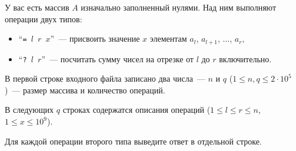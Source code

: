 
\Legend
У вас есть массив $A$ изначально заполненный нулями. Над ним выполняют операции двух типов:

\begin{itemize}
	\item ``\texttt{= $l$ $r$ $x$}''~--- присвоить значение $x$ элементам $a_l$, $a_{l+1}$, ..., $a_r$,
	\item ``\texttt{? $l$ $r$}''~--- посчитать сумму чисел на отрезке от $l$ до $r$ включительно.
\end{itemize}

\Input
В первой строке входного файла записано два числа~--- $n$ и $q$ ($1 \le n, q \le 2 \cdot 10^5$)~---
размер массива и количество операций.

В следующих $q$ строках содержатся описания операций ($1 \le l \le r \le n$, $1 \le x \le 10^9$).

\Output
Для каждой операции второго типа выведите ответ в отдельной строке.

\Samples
\BeginTests
{}
\EndTests

\EndProblem
